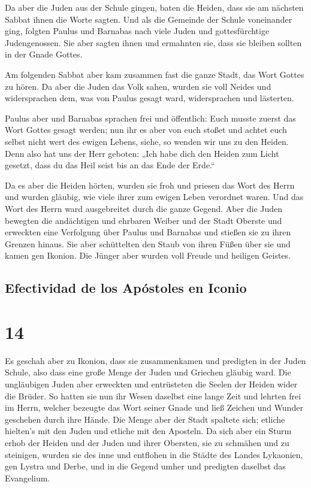  Da aber die Juden aus der Schule gingen, baten die
Heiden, dass sie am nächsten Sabbat ihnen die Worte sagten.
 Und als die Gemeinde der Schule voneinander ging,
folgten Paulus und Barnabas nach viele Juden und gottesfürchtige
Judengenossen. Sie aber sagten ihnen und ermahnten sie, dass sie bleiben
sollten in der Gnade Gottes.

 Am folgenden Sabbat aber kam zusammen fast die ganze
Stadt, das Wort Gottes zu hören.  Da aber die Juden das
Volk sahen, wurden sie voll Neides und widersprachen dem, was von Paulus
gesagt ward, widersprachen und lästerten.

 Paulus aber und Barnabas sprachen frei und öffentlich:
Euch musste zuerst das Wort Gottes gesagt werden; nun ihr es aber von
euch stoßet und achtet euch selbst nicht wert des ewigen Lebens, siehe,
so wenden wir uns zu den Heiden.  Denn also hat uns der
Herr geboten: „Ich habe dich den Heiden zum Licht gesetzt, dass du das
Heil seist bis an das Ende der Erde.``

 Da es aber die Heiden hörten, wurden sie froh und
priesen das Wort des Herrn und wurden gläubig, wie viele ihrer zum
ewigen Leben verordnet waren.  Und das Wort des Herrn
ward ausgebreitet durch die ganze Gegend.  Aber die Juden
bewegten die andächtigen und ehrbaren Weiber und der Stadt Oberste und
erweckten eine Verfolgung über Paulus und Barnabas und stießen sie zu
ihren Grenzen hinaus.  Sie aber schüttelten den Staub von
ihren Füßen über sie und kamen gen Ikonion.  Die Jünger
aber wurden voll Freude und heiligen Geistes.

\hypertarget{efectividad-de-los-apuxf3stoles-en-iconio}{%
\subsection{Efectividad de los Apóstoles en
Iconio}\label{efectividad-de-los-apuxf3stoles-en-iconio}}

\hypertarget{section-13}{%
\section{14}\label{section-13}}

 Es geschah aber zu Ikonion, dass sie zusammenkamen und
predigten in der Juden Schule, also dass eine große Menge der Juden und
Griechen gläubig ward.  Die ungläubigen Juden aber
erweckten und entrüsteten die Seelen der Heiden wider die Brüder.
 So hatten sie nun ihr Wesen daselbst eine lange Zeit und
lehrten frei im Herrn, welcher bezeugte das Wort seiner Gnade und ließ
Zeichen und Wunder geschehen durch ihre Hände.  Die Menge
aber der Stadt spaltete sich; etliche hielten's mit den Juden und
etliche mit den Aposteln.  Da sich aber ein Sturm erhob
der Heiden und der Juden und ihrer Obersten, sie zu schmähen und zu
steinigen,  wurden sie des inne und entflohen in die
Städte des Landes Lykaonien, gen Lystra und Derbe, und in die Gegend
umher  und predigten daselbst das Evangelium.

